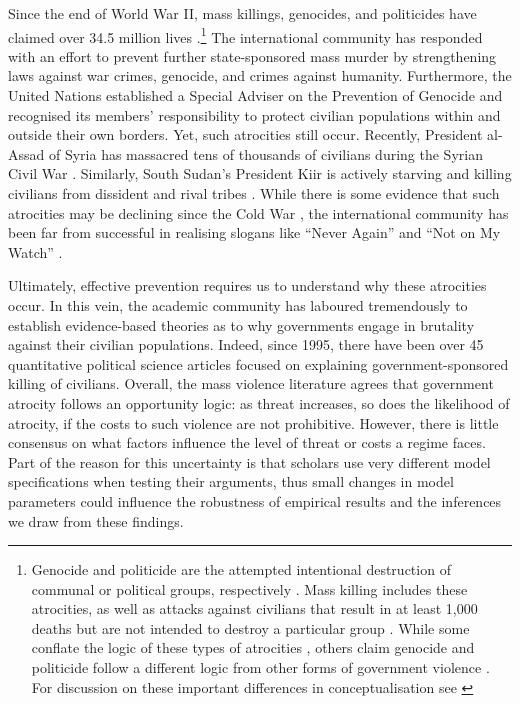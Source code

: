 \documentclass[a4paper,12pt]{article}
\begin{document}
Since the end of World War II, mass killings, genocides, and politicides have claimed over 34.5 million lives \citep{marshall2017pitf}.\footnote{Genocide and politicide are the attempted intentional destruction of communal or political groups, respectively \citep[see][]{harff1988toward}. Mass killing includes these atrocities, as well as attacks against civilians that result in at least 1,000 deaths but are not intended to destroy a particular group \citep[see][]{ulfelder2008assessing}. While some conflate the logic of these types of atrocities \citep[e.g.,][]{rummel1995democracy, valentino2004draining}, others claim genocide and politicide follow a different logic from other forms of government violence \citep{kalyvas2006logic,stanton2015regulating}. For discussion on these important differences in conceptualisation see \citep[]{straus2007second, finkel2012macro}} The international community has responded with an effort to prevent further state-sponsored mass murder by strengthening laws against war crimes, genocide, and crimes against humanity. Furthermore, the United Nations established a Special Adviser on the Prevention of Genocide and recognised its members' responsibility to protect civilian populations within and outside their own borders. Yet, such atrocities still occur. Recently, President al-Assad of Syria has massacred tens of thousands of civilians during the Syrian Civil War \citep{goldman2017nyt}. Similarly, South Sudan's President Kiir is actively starving and killing civilians from dissident and rival tribes \citep{nichols2017reuters}. While there is some evidence that such atrocities may be declining since the Cold War \citep{valentino2014we}, the international community has been far from successful in realising slogans like ``Never Again'' and ``Not on My Watch'' \citep{cheadle2007not}.
	
Ultimately, effective prevention requires us to understand why these atrocities occur. In this vein, the academic community has laboured tremendously to establish evidence-based theories as to why governments engage in brutality against their civilian populations. Indeed, since 1995, there have been over 45 quantitative political science articles focused on explaining government-sponsored killing of civilians. Overall, the mass violence literature agrees that government atrocity follows an opportunity logic: as threat increases, so does the likelihood of atrocity, if the costs to such violence are not prohibitive. However, there is little consensus on what factors influence the level of threat or costs a regime faces. Part of the reason for this uncertainty is that scholars use very different model specifications when testing their arguments, thus small changes in model parameters could influence the robustness of empirical results and the inferences we draw from these findings.
	
\end{document}

